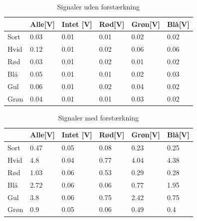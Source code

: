\begin{table}[H]
\centering
\caption{Signaler uden forstærkning} \label{tab:farveudenforstaerker}
\label{my-label}
\begin{tabular}{l|lllll}
\hline \hline
     & Alle{[\si{V}]} & Intet {[\si{V}]} & Rød{[\si{V}]} & Grøn{[\si{V}]} & Blå{[\si{V}]} \\
     \hline
Sort & 0.03        & 0.01          & 0.01       & 0.02        & 0.02       \\
Hvid & 0.12        & 0.01          & 0.02       & 0.06        & 0.06       \\
Rød  & 0.03        & 0.01          & 0.02       & 0.01        & 0.02       \\
Blå  & 0.05        & 0.01          & 0.01       & 0.02        & 0.03       \\
Gul  & 0.06        & 0.01          & 0.02       & 0.04        & 0.02       \\
Grøn & 0.04        & 0.01          & 0.01       & 0.03        & 0.02 \\[1ex]
\hline     
\end{tabular}
\end{table}
\begin{table}[H]
\centering
\caption{Signaler med forstærkning} \label{tab:farvemedforstaerker}
\begin{tabular}{l|lllll}
\hline\hline
     & Alle{[\si{V}]} & Intet {[\si{V}]} & Rød{[\si{V}]} & Grøn{[\si{V}]} & Blå{[\si{V}]} \\
     \hline
Sort & 0.47        & 0.05          & 0.08       & 0.23        & 0.25       \\
Hvid & 4.8         & 0.04          & 0.77       & 4.04        & 4.38       \\
Rød  & 1.03        & 0.06          & 0.53       & 0.29        & 0.28       \\
Blå  & 2.72        & 0.06          & 0.06       & 0.77        & 1.95       \\
Gul  & 3.8         & 0.06          & 0.75       & 2.42        & 0.75       \\
Grøn & 0.9         & 0.05          & 0.06       & 0.49        & 0.4 \\[1ex]
\hline
\end{tabular}
\end{table}


